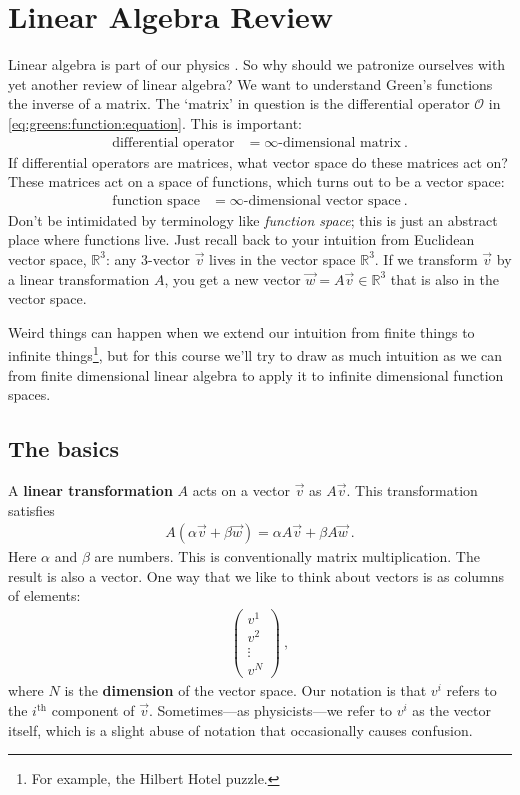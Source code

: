 
\section{Linear Algebra Review}

Linear algebra is part of our physics . So why should we patronize ourselves with yet another review of linear algebra?
%
We want to understand Green’s functions the inverse of a matrix. The `matrix' in question is the differential operator $\mathcal O$ in \eqref{eq:greens:function:equation}.
%
This is important:
\begin{align}
	\text{differential operator}
	&=
	\infty\text{-dimensional matrix} \ .
\end{align}
If differential operators are matrices, what vector space do these matrices act on? These matrices act on a space of functions, which turns out to be a vector space:
\begin{align}
  \text{function space} &= \infty\text{-dimensional vector space} \ .
\end{align}
Don't be intimidated by terminology like \emph{function space}; this is just an abstract place where functions live. Just recall back to your intuition from  Euclidean vector space, $\mathbb{R}^3$: any 3-vector $\vec{v}$ lives in the vector space $\mathbb{R}^3$. If we transform $\vec{v}$ by a linear transformation ${A}$, you get a new vector  $\vec{w} = {A}\vec{v} \in \mathbb{R}^3$ that is also in the vector space.

%
Weird things can happen when we extend our intuition from finite things to infinite things\footnote{For example, the Hilbert Hotel puzzle.}, but for this course we'll try to draw as much intuition as we can from finite dimensional linear algebra to apply it to infinite dimensional function spaces.

\subsection{The basics}

A \textbf{linear transformation} $A$ acts on a vector $\vec{v}$ as $A\vec{v}$. 
This transformation satisfies
\begin{align}
  A(\alpha \vec{v}+ \beta \vec{w}) = \alpha A\vec{v} + \beta A\vec{w} \ .
\end{align}
Here $\alpha$ and $\beta$ are numbers.
%
This is conventionally matrix multiplication. The result is also a vector. One way that we like to think about vectors is as columns of elements:
\begin{align}
  \begin{pmatrix}
    v^{1} \\ v^{2} \\ \vdots \\ v^{N}
  \end{pmatrix} \ ,
  \label{eq:vector:def:as:column}
\end{align}
where $N$ is the \textbf{dimension} of the vector space. Our notation is that $v^i$ refers to the $i^\text{th}$ component of $\vec{v}$. Sometimes---as physicists---we refer to $v^i$ as the vector itself, which is a slight abuse of notation that occasionally causes confusion.

